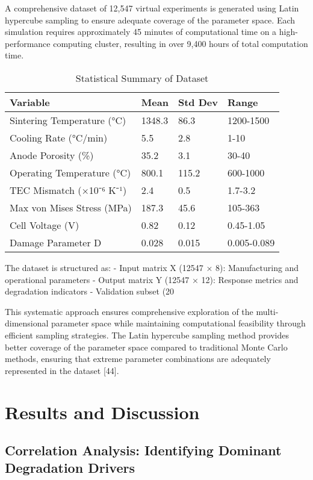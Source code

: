 \documentclass[10pt,conference]{IEEEtran}
\begin{document}
A comprehensive dataset of 12,547 virtual experiments is generated using Latin hypercube sampling to ensure adequate coverage of the parameter space. Each simulation requires approximately 45 minutes of computational time on a high-performance computing cluster, resulting in over 9,400 hours of total computation time.

\begin{table}[H]
\centering
\caption{Statistical Summary of Dataset}
\label{tab:dataset_stats}
\begin{tabular}{@{}llll@{}}
\toprule
Variable & Mean & Std Dev & Range \\
\midrule
Sintering Temperature (°C) & 1348.3 & 86.3 & 1200-1500 \\
Cooling Rate (°C/min) & 5.5 & 2.8 & 1-10 \\
Anode Porosity (\%) & 35.2 & 3.1 & 30-40 \\
Operating Temperature (°C) & 800.1 & 115.2 & 600-1000 \\
TEC Mismatch (×10⁻⁶ K⁻¹) & 2.4 & 0.5 & 1.7-3.2 \\
Max von Mises Stress (MPa) & 187.3 & 45.6 & 105-363 \\
Cell Voltage (V) & 0.82 & 0.12 & 0.45-1.05 \\
Damage Parameter D & 0.028 & 0.015 & 0.005-0.089 \\
\bottomrule
\end{tabular}
\end{table}

The dataset is structured as:
- Input matrix X (12547 × 8): Manufacturing and operational parameters
- Output matrix Y (12547 × 12): Response metrics and degradation indicators
- Validation subset (20%

This systematic approach ensures comprehensive exploration of the multi-dimensional parameter space while maintaining computational feasibility through efficient sampling strategies. The Latin hypercube sampling method provides better coverage of the parameter space compared to traditional Monte Carlo methods, ensuring that extreme parameter combinations are adequately represented in the dataset [44].

\section{Results and Discussion}

\subsection{Correlation Analysis: Identifying Dominant Degradation Drivers}
\end{document}
